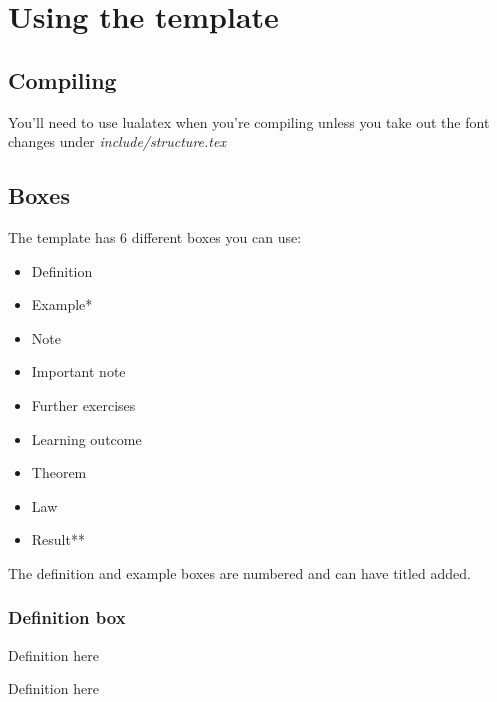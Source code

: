 \documentclass[11pt,a4paper,twoside]{report}
\begin{document}
\ShowClozetrue

\tableofcontents

\chapter{Using the template}

\section{Compiling}

\begin{important}
You'll need to use lualatex when you're compiling unless you take out the font changes under \textit{include/structure.tex}
\end{important}

\section{Boxes}

The template has 6 different boxes you can use:
\begin{itemize}
  \item Definition
  \item Example*
  \item Note
  \item Important note
  \item Further exercises
  \item Learning outcome
  \item Theorem
  \item Law
  \item Result**
\end{itemize}
The definition and example boxes are numbered and can have titled added.

\subsection{Definition box}

\begin{definition}[Title]
  Definition here
\end{definition}

\begin{definition}
  Definition here
\end{definition}
\end{document}
